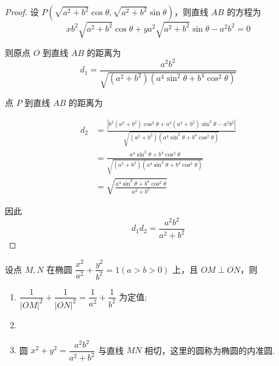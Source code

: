 \begin{proof}
    设 $P(\sqrt{a^2 + b^2} \cos \theta, \sqrt{a^2 + b^2} \sin \theta)$，则直线 $AB$ 的方程为
\[
x b^2 \sqrt{a^2 + b^2} \cos \theta + y a^2 \sqrt{a^2 + b^2} \sin \theta - a^2 b^2 = 0
\]

则原点 $O$ 到直线 $AB$ 的距离为
\[
d_1 = \frac{a^2 b^2}{\sqrt{(a^2 + b^2)(a^4 \sin^2 \theta + b^4 \cos^2 \theta)}}
\]

点 $P$ 到直线 $AB$ 的距离为

\begin{align*}
    d_2 &= \frac{|b^2 (a^2 + b^2) \cos^2 \theta + a^2 (a^2 + b^2) \sin^2 \theta - a^2 b^2|}{\sqrt{(a^2 + b^2)(a^4 \sin^2 \theta + b^4 \cos^2 \theta)}}\\
        &= \frac{a^4 \sin^2 \theta + b^4 \cos^2 \theta}{\sqrt{(a^2 + b^2)(a^4 \sin^2 \theta + b^4 \cos^2 \theta)}}\\
        &= \sqrt{\frac{a^4 \sin^2 \theta + b^4 \cos^2 \theta}{a^2 + b^2}}
\end{align*}



因此
\[
d_1 d_2 = \frac{a^2 b^2}{a^2 + b^2}
\]

\end{proof}


\begin{theorem}[椭圆的内准圆]
    设点 $M, N$ 在椭圆 $\dfrac{x^2}{a^2} + \dfrac{y^2}{b^2} = 1 (a > b > 0)$ 上，且 $OM \perp ON$，则
\begin{enumerate}
    \item $\dfrac{1}{|OM|^2} + \dfrac{1}{|ON|^2} = \dfrac{1}{a^2} + \dfrac{1}{b^2}$ 为定值;
    \item  \item 圆 $x^2 + y^2 = \dfrac{a^2 b^2}{a^2 + b^2}$ 与直线 $MN$ 相切，这里的圆称为椭圆的内准圆.
\end{enumerate}
\end{theorem}

